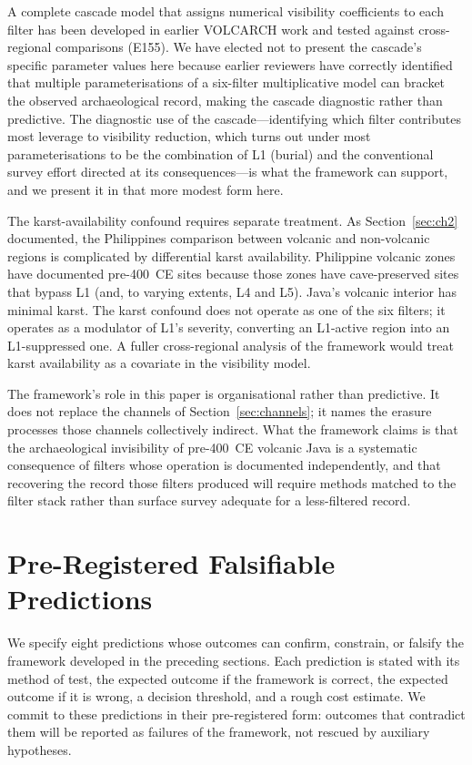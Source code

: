 \documentclass[12pt,a4paper]{article}
\begin{document}
A complete cascade model that assigns numerical visibility coefficients to each filter has been developed in earlier VOLCARCH work \citep[E110, E176]{amien_e110} and tested against cross-regional comparisons (E155). We have elected not to present the cascade's specific parameter values here because earlier reviewers have correctly identified that multiple parameterisations of a six-filter multiplicative model can bracket the observed archaeological record, making the cascade diagnostic rather than predictive. The diagnostic use of the cascade---identifying which filter contributes most leverage to visibility reduction, which turns out under most parameterisations to be the combination of L1 (burial) and the conventional survey effort directed at its consequences---is what the framework can support, and we present it in that more modest form here.

The karst-availability confound requires separate treatment. As Section~\ref{sec:ch2} documented, the Philippines comparison between volcanic and non-volcanic regions is complicated by differential karst availability. Philippine volcanic zones have documented pre-400~CE sites because those zones have cave-preserved sites that bypass L1 (and, to varying extents, L4 and L5). Java's volcanic interior has minimal karst. The karst confound does not operate as one of the six filters; it operates as a modulator of L1's severity, converting an L1-active region into an L1-suppressed one. A fuller cross-regional analysis of the framework would treat karst availability as a covariate in the visibility model.

The framework's role in this paper is organisational rather than predictive. It does not replace the channels of Section~\ref{sec:channels}; it names the erasure processes those channels collectively indirect. What the framework claims is that the archaeological invisibility of pre-400~CE volcanic Java is a systematic consequence of filters whose operation is documented independently, and that recovering the record those filters produced will require methods matched to the filter stack rather than surface survey adequate for a less-filtered record.


\section{Pre-Registered Falsifiable Predictions}
\label{sec:predictions}

We specify eight predictions whose outcomes can confirm, constrain, or falsify the framework developed in the preceding sections. Each prediction is stated with its method of test, the expected outcome if the framework is correct, the expected outcome if it is wrong, a decision threshold, and a rough cost estimate. We commit to these predictions in their pre-registered form: outcomes that contradict them will be reported as failures of the framework, not rescued by auxiliary hypotheses.
\end{document}
